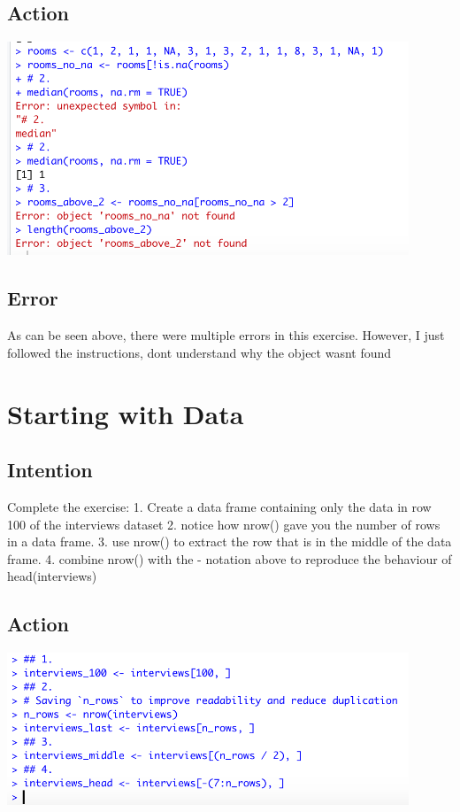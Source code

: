 \documentclass{article}
\begin{document}
\subsection{Action}
\includegraphics[width=12cm]{rooms.png}

\subsection{Error}
As can be seen above, there were multiple errors in this exercise. However, I just followed the instructions, dont understand why the object wasnt found

\section{Starting with Data}

\subsection{Intention}
Complete the exercise: 
1. Create a data frame containing only the data in row 100 of the interviews dataset
2. notice how nrow() gave you the number of rows in a data frame.
3. use nrow() to extract the row that is in the middle of the data frame.
4. combine nrow() with the - notation above to reproduce the behaviour of head(interviews)


\subsection{Action}
\includegraphics[width=12cm]{nrow.png}
\end{document}
